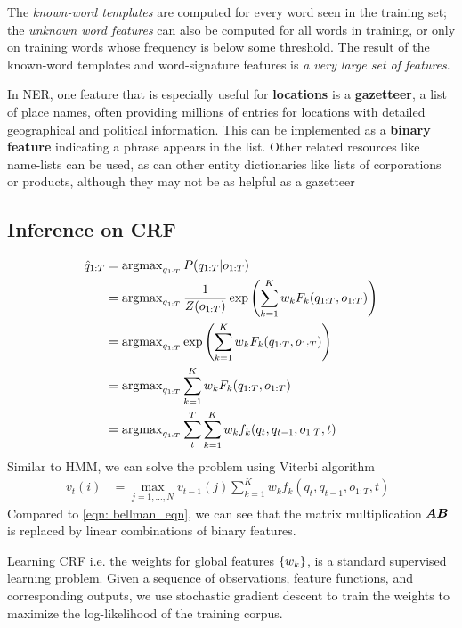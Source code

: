 \documentclass[11pt]{article}
\begin{document}
The \emph{known-word templates} are computed for every word seen in the training set; the \emph{unknown word features} can also be computed for all words in training, or only on training words whose frequency is below some threshold. The result of the known-word templates and word-signature features is \emph{a very large set of features}.

In NER, one feature that is especially useful for \textbf{locations} is a \textbf{gazetteer}, a list of place names, often providing millions of entries for locations with detailed geographical and political information. This can be implemented as a \textbf{binary feature} indicating a phrase appears in the list. Other related resources like name-lists can be used, as can other entity dictionaries like lists of corporations or products, although they may not be as helpful as a gazetteer

\subsection{Inference on CRF}
\begin{align*}
\hat{q}_{1:T} &= \operatorname{argmax}_{q_{1:T}} P(q_{1:T} | o_{1:T})\\
&=  \operatorname{argmax}_{q_{1:T}} \frac{1}{Z(o_{1:T})} \exp\left(\sum_{k=1}^{K}w_{k}F_{k}(q_{1:T}, o_{1:T})\right) \\
&=  \operatorname{argmax}_{q_{1:T}}  \exp\left(\sum_{k=1}^{K}w_{k}F_{k}(q_{1:T}, o_{1:T})\right) \\
&=  \operatorname{argmax}_{q_{1:T}}  \sum_{k=1}^{K}w_{k}F_{k}(q_{1:T}, o_{1:T}) \\
&=  \operatorname{argmax}_{q_{1:T}}  \sum_{t}^{T}\sum_{k=1}^{K}w_{k}f_{k}(q_{t}, q_{t-1}, o_{1:T}, t) 
\end{align*} Similar to HMM, we can solve the problem using Viterbi algorithm 
\begin{align}
v_{t}(i)&= \max_{j=1,\ldots,N}v_{t-1}(j)\sum_{k=1}^{K}w_{k}f_{k}(q_{t}, q_{t-1}, o_{1:T}, t)    \;\;\label{eqn: CRF_inference}
\end{align} Compared to \eqref{eqn: bellman_eqn}, we can see that the matrix multiplication $\boldsymbol{A}\boldsymbol{B}$ is replaced by linear combinations of binary features.  

Learning CRF i.e. the weights for global features $\left\{w_{k}\right\}$, is a standard supervised learning problem. Given a sequence of observations, feature functions, and corresponding outputs, we use stochastic gradient descent to train the weights to maximize the log-likelihood of the training corpus. 
\end{document}
